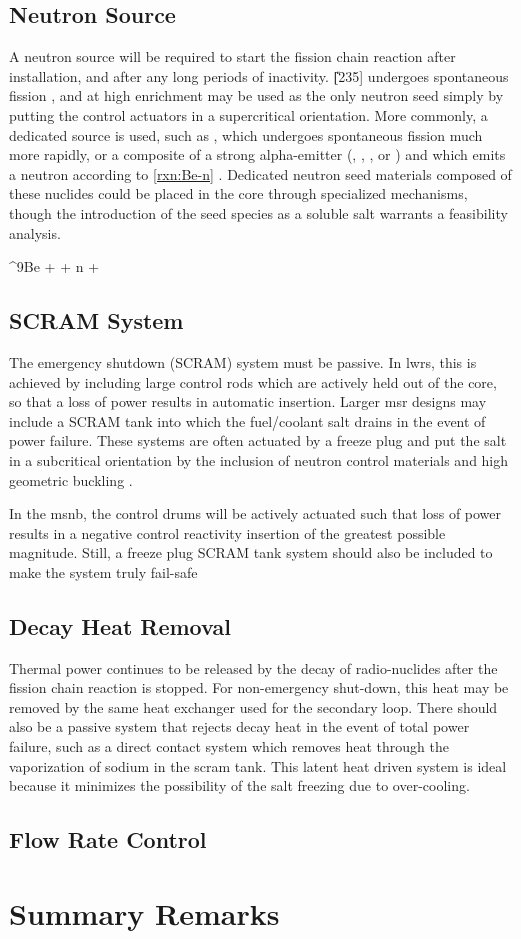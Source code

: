 \subsection{Neutron Source}
A neutron source will be required to start the fission chain reaction after installation, and after any long periods of inactivity. \U[235] undergoes spontaneous fission \cite[Ch. 6]{Faw}, and at high enrichment may be used as the only neutron seed simply by putting the control actuators in a supercritical orientation. More commonly, a dedicated source is used, such as \Ca[252], which undergoes spontaneous fission much more rapidly, or a composite of a strong alpha-emitter (\eg \Pu[238], \Am[241], \Po[210], or \Ra[226]) and \Be[9] which emits a neutron according to \ref{rxn:Be-n} \cite[Ch. 2]{Handbook}. Dedicated neutron seed materials composed of these nuclides could be placed in the core through specialized mechanisms, though the introduction of the seed species as a soluble salt warrants a feasibility analysis.  

\begin{reaction}\label{rxn:Be-n}
    ^{9}Be + \alpha {} + n + \gamma
\end{reaction}

\subsection{SCRAM System}
The emergency shutdown (\ie SCRAM) system must be passive. In \acsp{lwr}, this is achieved by including large control rods which are actively held out of the core, so that a loss of power results in automatic insertion. Larger \acs{msr} designs may include a SCRAM tank into which the fuel/coolant salt drains in the event of power failure. These systems are often actuated by a freeze plug \cite{FreezePlug} and put the salt in a subcritical orientation by the inclusion of neutron control materials \cite[Ch. 1]{Charit} and high geometric buckling \cite[Ch. 6]{Lamarsh}.

In the \acs{msnb}, the control drums will be actively actuated such that loss of power results in a negative control reactivity insertion of the greatest possible magnitude. Still, a freeze plug SCRAM tank system should also be included to make the system truly fail-safe 

\subsection{Decay Heat Removal}
Thermal power continues to be released by the decay of radio-nuclides after the fission chain reaction is stopped. For non-emergency shut-down, this heat may be removed by the same heat exchanger used for the secondary loop. There should also be a passive system that rejects decay heat in the event of total power failure, such as a direct contact system which removes heat through the vaporization of sodium \cite{DecayHeat} in the scram tank. This latent heat driven system is ideal because it minimizes the possibility of the salt freezing due to over-cooling.

\subsection{Flow Rate Control}


\section{Summary Remarks}